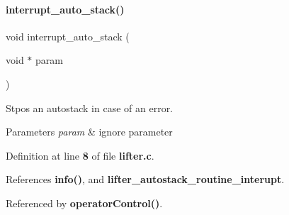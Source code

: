 \paragraph{interrupt\+\_\+auto\+\_\+stack()}
{\footnotesize\ttfamily void interrupt\+\_\+auto\+\_\+stack (\begin{DoxyParamCaption}\item[{void $\ast$}]{param }\end{DoxyParamCaption})}



Stpos an autostack in case of an error. 


\begin{DoxyParams}{Parameters}
{\em param} & ignore parameter \\
\hline
\end{DoxyParams}


Definition at line \textbf{ 8} of file \textbf{ lifter.\+c}.



References \textbf{ info()}, and \textbf{ lifter\+\_\+autostack\+\_\+routine\+\_\+interupt}.



Referenced by \textbf{ operator\+Control()}.


